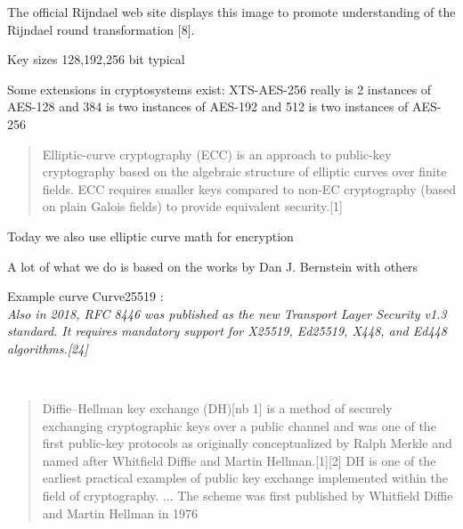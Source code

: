 \documentclass[Screen16to9,17pt]{foils}
\begin{document}


\begin{list2}
\item The official Rijndael web site displays this image to promote understanding of the Rijndael round transformation [8].
\item Key sizes 128,192,256 bit typical
\item Some extensions in cryptosystems exist: XTS-AES-256 really is 2 instances of AES-128 and 384 is two instances of AES-192 and 512 is two instances of AES-256
\item {}
\end{list2}




\begin{quote}
Elliptic-curve cryptography (ECC) is an approach to public-key cryptography based on the algebraic structure of elliptic curves over finite fields. ECC requires smaller keys compared to non-EC cryptography (based on plain Galois fields) to provide equivalent security.[1]
\end{quote}

\begin{list2}
\item Today we also use elliptic curve math for encryption 
\item A lot of what we do is based on the works by Dan J. Bernstein  with others
\item Example curve Curve25519 :\\
\emph{Also in 2018, RFC 8446 was published as the new Transport Layer Security v1.3 standard. It requires mandatory support for X25519, Ed25519, X448, and Ed448 algorithms.[24]}
\end{list2}



{~}

\begin{quote}
Diffie–Hellman key exchange (DH)[nb 1] is a method of securely exchanging cryptographic keys over a public channel and was one of the first public-key protocols as originally conceptualized by Ralph Merkle and named after Whitfield Diffie and Martin Hellman.[1][2] DH is one of the earliest practical examples of public key exchange implemented within the field of cryptography.
... The scheme was first published by Whitfield Diffie and Martin Hellman in 1976
\end{quote}
\end{document}
